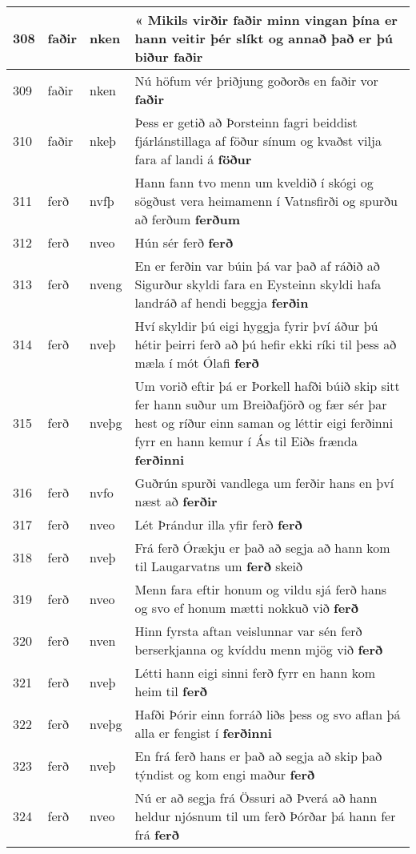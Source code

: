 \documentclass{article}
\begin{document}
\begin{longtable}{p{1cm}|p{1cm}|p{1cm}|p{13cm}}
\hline
308&faðir&nken&« Mikils virðir faðir minn vingan þína er hann veitir þér slíkt og annað það er þú biður \textbf{faðir} \\
\hline
309&faðir&nken&Nú höfum vér þriðjung goðorðs en faðir vor \textbf{faðir} \\
\hline
310&faðir&nkeþ&Þess er getið að Þorsteinn fagri beiddist fjárlánstillaga af föður sínum og kvaðst vilja fara af landi á \textbf{föður} \\
\hline
311&ferð&nvfþ&Hann fann tvo menn um kveldið í skógi og sögðust vera heimamenn í Vatnsfirði og spurðu að ferðum \textbf{ferðum} \\
\hline
312&ferð&nveo&Hún sér ferð \textbf{ferð} \\
\hline
313&ferð&nveng&En er ferðin var búin þá var það af ráðið að Sigurður skyldi fara en Eysteinn skyldi hafa landráð af hendi beggja \textbf{ferðin} \\
\hline
314&ferð&nveþ&Hví skyldir þú eigi hyggja fyrir því áður þú hétir þeirri ferð að þú hefir ekki ríki til þess að mæla í mót Ólafi \textbf{ferð} \\
\hline
315&ferð&nveþg&Um vorið eftir þá er Þorkell hafði búið skip sitt fer hann suður um Breiðafjörð og fær sér þar hest og ríður einn saman og léttir eigi ferðinni fyrr en hann kemur í Ás til Eiðs frænda \textbf{ferðinni} \\
\hline
316&ferð&nvfo&Guðrún spurði vandlega um ferðir hans en því næst að \textbf{ferðir} \\
\hline
317&ferð&nveo&Lét Þrándur illa yfir ferð \textbf{ferð} \\
\hline
318&ferð&nveþ&Frá ferð Órækju er það að segja að hann kom til Laugarvatns um \textbf{ferð} skeið\\
\hline
319&ferð&nveo&Menn fara eftir honum og vildu sjá ferð hans og svo ef honum mætti nokkuð við \textbf{ferð} \\
\hline
320&ferð&nven&Hinn fyrsta aftan veislunnar var sén ferð berserkjanna og kvíddu menn mjög við \textbf{ferð} \\
\hline
321&ferð&nveþ&Létti hann eigi sinni ferð fyrr en hann kom heim til \textbf{ferð} \\
\hline
322&ferð&nveþg&Hafði Þórir einn forráð liðs þess og svo aflan þá alla er fengist í \textbf{ferðinni} \\
\hline
323&ferð&nveþ&En frá ferð hans er það að segja að skip það týndist og kom engi maður \textbf{ferð} \\
\hline
324&ferð&nveo&Nú er að segja frá Össuri að Þverá að hann heldur njósnum til um ferð Þórðar þá hann fer frá \textbf{ferð} \\

\end{longtable}
\end{document}
